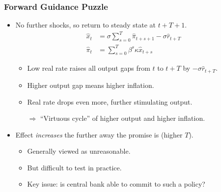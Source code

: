 \documentclass[english,xcolor=svgnames]{beamer}
\begin{document}
\begin{frame}
\frametitle{Forward Guidance Puzzle}

\begin{itemize}
\item No further shocks, so return to steady state at $t+T+1$.
\begin{align*}
		\hat{x}_t &= \sigma \sum_{s=0}^{T}\hat{\pi}_{t+s+1} - \sigma \hat{r}_{t+T}  \\
		\hat{\pi}_t&=\sum_{s=0}^{T}\beta^s \kappa \hat{x}_{t+s}
	\end{align*}
	\begin{itemize}
		\item Low real rate raises all output gaps from $t$ to $t+T$ by $-\sigma \hat{r}_{t+T}$.
		\item Higher output gap means higher inflation.
		\item Real rate drops even more, further stimulating output.
		\item[$\Rightarrow$] ``Virtuous cycle'' of higher output and higher inflation.
	\end{itemize}
	\item Effect \emph{increases} the further away the promise is (higher $T$).
	\begin{itemize}
		\item Generally viewed as unreasonable.
		\item But difficult to test in practice.
		\item Key issue: is central bank able to commit to such a policy?
	\end{itemize}
\end{itemize}	
\end{frame}
\end{document}

